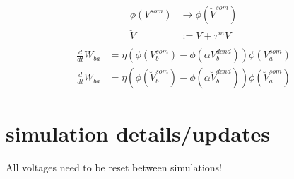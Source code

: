 \begin{align}
  \phi(V^{som}) & \rightarrow \phi(\breve{V}^{som}) \\
  \breve{V}     & := V + \tau^m \dot{V}             \\
\end{align}
\begin{align}
  \frac{d}{dt} W_{ba} & = \eta (\phi(V_b^{som}) - \phi(\alpha V_b^{dend})) \phi(V_a^{som})                         \\
  \frac{d}{dt} W_{ba} & = \eta (\phi(\breve{V}_b^{som}) - \phi(\alpha \breve{V}_b^{dend})) \phi(\breve{V}_a^{som})
\end{align}


\section{simulation details/updates}

All voltages need to be reset between simulations!

